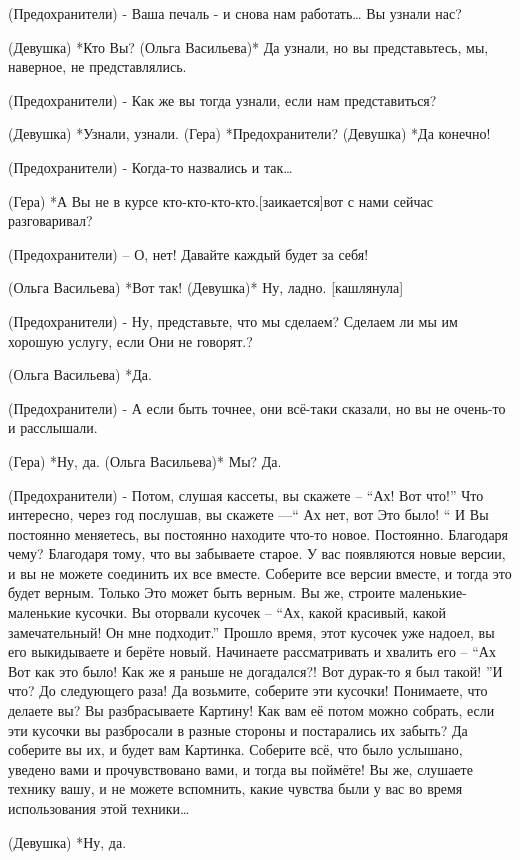 (Предохранители) - Ваша печаль - и снова нам работать… Вы узнали нас?

(Девушка) *Кто Вы?
(Ольга Васильева)* Да узнали, но вы представьтесь, мы, наверное, не представлялись.

(Предохранители) - Как же вы тогда узнали, если нам представиться?

(Девушка) *Узнали, узнали.
(Гера) *Предохранители?
(Девушка) *Да конечно!

(Предохранители) - Когда-то назвались и так…

(Гера) *А Вы не в курсе кто-кто-кто-кто.[заикается]вот с нами сейчас разговаривал?

(Предохранители) – О, нет! Давайте каждый будет за себя!

(Ольга Васильева) *Вот так!
(Девушка)* Ну, ладно. [кашлянула]

(Предохранители) - Ну, представьте, что мы сделаем? Сделаем ли мы им хорошую услугу, если Они не говорят.?

(Ольга Васильева) *Да.

(Предохранители) - А если быть точнее, они всё-таки сказали, но вы не очень-то и расслышали.

(Гера) *Ну, да.
(Ольга Васильева)* Мы? Да.

(Предохранители) - Потом, слушая кассеты, вы скажете – “Ах! Вот что!”  Что интересно, через год послушав, вы скажете —“ Ах нет, вот Это было! “ И Вы постоянно меняетесь, вы постоянно находите что-то новое. Постоянно. Благодаря чему? Благодаря тому, что вы забываете старое. У вас появляются новые версии, и вы не можете соединить их все вместе. Соберите все версии вместе, и тогда это будет верным. Только Это может быть верным. Вы же, строите маленькие-маленькие кусочки. Вы оторвали кусочек – “Ах, какой красивый, какой замечательный! Он мне подходит.”  Прошло время, этот кусочек уже надоел, вы его выкидываете и берёте новый. Начинаете рассматривать и хвалить его – “Ах Вот как это было! Как же я раньше не догадался?! Вот дурак-то я был такой! ”И что? До следующего раза! Да возьмите, соберите эти кусочки! Понимаете, что делаете вы? Вы разбрасываете Картину! Как вам её потом можно собрать, если эти кусочки вы разбросали в разные стороны и постарались их забыть? Да соберите вы их, и будет вам Картинка. Соберите всё, что было услышано, уведено вами и прочувствовано вами,  и тогда вы поймёте! Вы же, слушаете технику вашу, и не можете вспомнить, какие чувства были у вас во время использования этой техники…

(Девушка) *Ну, да.

